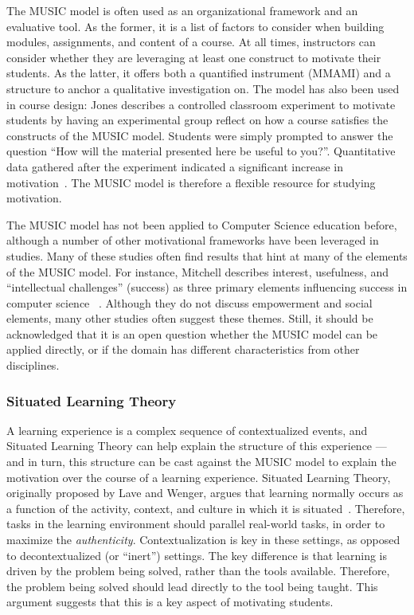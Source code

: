 The MUSIC model is often used as an organizational framework and an evaluative tool.
As the former, it is a list of factors to consider when building modules, assignments, and content of a course.
At all times, instructors can consider whether they are leveraging at least one construct to motivate their students.
As the latter, it offers both a quantified instrument (MMAMI) and a structure to anchor a qualitative investigation on.
The model has also been used in course design: Jones describes a controlled classroom experiment to motivate students by having an experimental group reflect on how a course satisfies the constructs of the MUSIC model. Students were simply prompted to answer the question ``How will the material presented here be useful to you?''.
Quantitative data gathered after the experiment indicated a significant increase in motivation~\cite{mcginley2014brief}.
The MUSIC model is therefore a flexible resource for studying motivation.

The MUSIC model has not been applied to Computer Science education before, although a number of other motivational frameworks have been leveraged in studies.
Many of these studies often find results that hint at many of the elements of the MUSIC model.
For instance, Mitchell describes interest, usefulness, and ``intellectual challenges'' (success) as three primary elements influencing success in computer science~\cite{Mitchell:2000} .
Although they do not discuss empowerment and social elements, many other studies often suggest these themes.
Still, it should be acknowledged that it is an open question whether the MUSIC model can be applied directly, or if the domain has different characteristics from other disciplines.

\subsubsection{Situated Learning Theory}

A learning experience is a complex sequence of contextualized events, and Situated Learning Theory can help explain the structure of this experience --- and in turn, this structure can be cast against the MUSIC model to explain the motivation over the course of a learning experience.
Situated Learning Theory, originally proposed by Lave and Wenger, argues that learning normally occurs as a function of the activity, context, and culture in which it is situated~\cite{lave-situated}.
Therefore, tasks in the learning environment should parallel real-world tasks, in order to maximize the \textit{authenticity}.
Contextualization is key in these settings, as opposed to decontextualized (or ``inert'') settings.
The key difference is that learning is driven by the problem being solved, rather than the tools available. Therefore, the problem being solved should lead directly to the tool being taught.
This argument suggests that this is a key aspect of motivating students.

